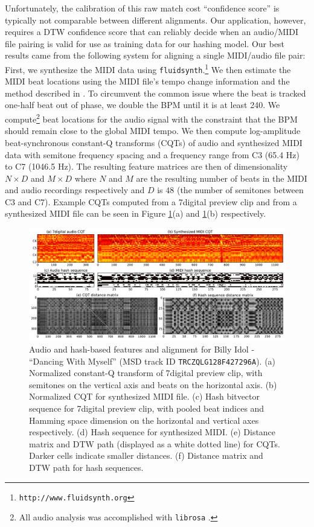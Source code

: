 \documentclass{article}
\begin{document}
Unfortunately, the calibration of this raw match cost ``confidence score'' is typically not comparable between different alignments.  
Our application, however, requires a DTW confidence score that can reliably decide when an audio/MIDI file pairing is valid for use as training data for our hashing model.
Our best results came from the following system for aligning a single MIDI/audio file pair:
First, we synthesize the MIDI data using \texttt{fluidsynth}.\footnote{\texttt{http://www.fluidsynth.org}}
We then estimate the MIDI beat locations using the MIDI file's tempo change information and the method described in \cite{raffel2014pretty_midi}.
To circumvent the common issue where the beat is tracked one-half beat out of phase, we double the BPM until it is at least 240.
We compute\footnote{All audio analysis was accomplished with \texttt{librosa} \cite{mcfee2014librosa}.} beat locations for the audio signal with the constraint that the BPM should remain close to the global MIDI tempo.
We then compute log-amplitude beat-synchronous constant-Q transforms (CQTs) of audio and synthesized MIDI data with semitone frequency spacing and a frequency range from C3 (65.4 Hz) to C7 (1046.5 Hz).
The resulting feature matrices are then of dimensionality $N \times D$ and $M \times D$ where $N$ and $M$ are the resulting number of beats in the MIDI and audio recordings respectively and $D$ is $48$ (the number of semitones between C3 and C7).
Example CQTs computed from a 7digital preview clip and from a synthesized MIDI file can be seen in Figure \ref{fig:simdtw}(a) and \ref{fig:simdtw}(b) respectively.

\begin{figure}
  \includegraphics[width=\textwidth]{sims_and_dtws.pdf}
  \caption{Audio and hash-based features and alignment for Billy Idol - ``Dancing With Myself'' (MSD track ID \texttt{TRCZQLG128F427296A}).
           (a) Normalized constant-Q transform of 7digital preview clip, with semitones on the vertical axis and beats on the horizontal axis.
	   (b) Normalized CQT for synthesized MIDI file.
	   (c) Hash bitvector sequence for 7digital preview clip, with pooled beat indices and Hamming space dimension on the horizontal and vertical axes respectively.
	   (d) Hash sequence for synthesized MIDI.
	   (e) Distance matrix and DTW path (displayed as a white dotted line) for CQTs.  Darker cells indicate smaller distances.
	   (f) Distance matrix and DTW path for hash sequences.}
  \label{fig:simdtw}
\end{figure}
\end{document}
